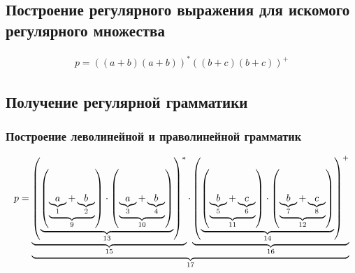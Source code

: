 \subsection{Построение регулярного выражения для искомого регулярного множества}
\begin{align}\label{eq:regex}
	p=((a+b)(a+b))^*((b+c)(b+c))^+
\end{align}
\subsection{Получение регулярной грамматики}
\subsubsection{Построение леволинейной и праволинейной грамматик}
\begin{align}\label{eq:regex-desc}
	p=\ub{\ub{\rbr{\ub{
					\rbr{\ub{%
							\ub{a}_{1} + \ub{b}_{2}%
						}_{9}}
					\cdot
					\rbr{\ub{%
							\ub{a}_{3} + \ub{b}_{4}%
						}_{10}}}_{13}}^*}_{15}
		\cdot
		\ub{\rbr{\ub{\rbr{\ub{%
							\ub{b}_{5} + \ub{c}_{6}%
						}_{11}}
					\cdot
					\rbr{\ub{%
							\ub{b}_{7} + \ub{c}_{8}%
						}_{12}}}_{14}}^{+}}_{16}}_{17}
\end{align}
